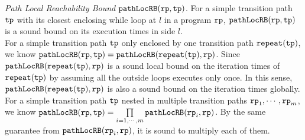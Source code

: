 \emph{Path Local Reachability Bound}  $\mathtt{pathLocRB}(\mathtt{rp}, \mathtt{tp})$.
For a simple transition path $\mathtt{tp}$ with its closest enclosing while loop at $l$ in a program $\mathtt{rp}$, 
$\mathtt{pathLocRB}(\mathtt{rp}, \mathtt{tp})$
is a sound bound on its execution times in side $l$.
\\
For a simple transition path $\mathtt{tp}$ only enclosed by one transition path $\mathtt{repeat}(\mathtt{tp})$, 
we know $\mathtt{pathLocRB}(\mathtt{rp}, \mathtt{tp}) = \mathtt{pathLocRB}(\mathtt{repeat}(\mathtt{tp}), \mathtt{rp})$.
Since $\mathtt{pathLocRB}(\mathtt{repeat}(\mathtt{tp}), \mathtt{rp})$ is a sound local bound on the iteration times
of $\mathtt{repeat}(\mathtt{tp})$ by assuming all the outside loops executes only once.
In this sense, $\mathtt{pathLocRB}(\mathtt{repeat}(\mathtt{tp}), \mathtt{rp})$ is also a sound bound on the iteration times globally.
\\
For a simple transition path $\mathtt{tp}$ nested in multiple transition paths $\mathtt{rp}_1, \cdots, \mathtt{rp}_m$,
we know $\mathtt{pathLocRB}(\mathtt{rp}, \mathtt{tp}) = \prod\limits_{i = 1, \cdots, m}\mathtt{pathLocRB}(\mathtt{rp}_i, \mathtt{rp})$.
By the same guarantee from $\mathtt{pathLocRB}(\mathtt{rp}_i, \mathtt{rp})$, it is sound to multiply each of them.

